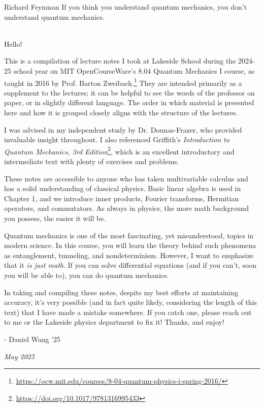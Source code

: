\begin{shadequote}[l]{Richard Feynman}
    If you think you understand quantum mechanics, you don't understand quantum mechanics. 
\end{shadequote}
\ \\
Hello!

This is a compilation of lecture notes I took at Lakeside School during the 2024-25 school year on MIT OpenCourseWare's 8.04 Quantum Mechanics I course, as taught in 2016 by Prof. Barton Zweibach.\footnote{ \url{https://ocw.mit.edu/courses/8-04-quantum-physics-i-spring-2016/}} They are intended primarily as a supplement to the lectures; it can be helpful to see the words of the professor on paper, or in slightly different language. The order in which material is presented here and how it is grouped closely aligns with the structure of the lectures. 

I was advised in my independent study by Dr. Dounas-Frazer, who provided invaluable insight throughout. I also referenced Griffith's \textit{Introduction to Quantum Mechanics, 3rd Edition}\footnote{\url{https://doi.org/10.1017/9781316995433}}, which is an excellent introductory and intermediate text with plenty of exercises and problems. 

These notes are accessible to anyone who has taken multivariable calculus and has a solid understanding of classical physics. Basic linear algebra is used in Chapter 1, and we introduce inner products, Fourier transforms, Hermitian operators, and commutators. As always in physics, the more math background you possess, the easier it will be.

Quantum mechanics is one of the most fascinating, yet misunderstood, topics in modern science. In this course, you will learn the theory behind such phenomena as entanglement, tunneling, and nondeterminism. However, I want to emphasize that it \textit{is just math}. If you can solve differential equations (and if you can't, soon you will be able to), you can do quantum mechanics. 

In taking and compiling these notes, despite my best efforts at maintaining accuracy, it's very possible (and in fact quite likely, considering the length of this text) that I have made a mistake somewhere. If you catch one, please reach out to me or the Lakeside physics department to fix it! Thanks, and enjoy!

- Daniel Wang '25

\textit{May 2025}

